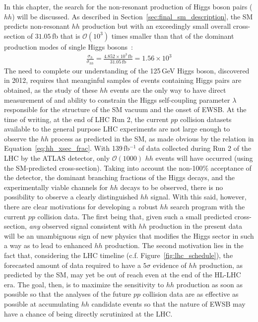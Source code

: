 In this chapter, the search for the non-resonant production of Higgs boson pairs ($hh$) will be discussed.
As described in Section~\ref{sec:final_sm_description}, the SM predicts non-resonant $hh$ production but with
an exceedingly small overall cross-section of $31.05$\,fb that is $\mathcal{O}(10^3)$ times smaller
than that of the dominant production modes of single Higgs bosons~\cite{deFlorian:2016spz,Dawson:1998py,Borowka:2016ehy,Baglio:2018lrj,deFlorian:2013jea,Shao:2013bz,deFlorian:2015moa,Grazzini:2018bsd}:
\begin{align}
    \frac{\sigma_h}{\sigma_{hh}} = \frac{ 4.852 \times 10^3\,\mathrm{fb}}{31.05\,\mathrm{fb}} = 1.56 \times 10^3
    \label{eq:hh_xsec_frac}
\end{align}
The need to complete our understanding of the 125\,GeV Higgs boson, discovered in 2012, requires
that meanginful samples of events containing Higgs pairs are obtained, as the study of these $hh$
events are the only way to have direct measurement of and ability to constrain the Higgs self-coupling parameter $\lambda$
responsible for the structure of the SM vacuum and the onset of EWSB.
At the time of writing, at the end of LHC Run 2, the current $pp$ collision datasets available to the
general purpose LHC experiments are not large enough to observe the $hh$ process as predicted in the SM,
as made obvious by the relation in  Equation~\ref{eq:hh_xsec_frac}.
With 139\,fb$^{-1}$ of data collected during Run 2 of the LHC by the ATLAS detector,
only $\mathcal{O}(1000)$ $hh$ events will have occurred (using the SM-predicted cross-section).
Taking into account the non-100\% acceptance of the detector, the dominant branching fractions
of the Higgs decays, and the experimentally viable channels for $hh$ decays to be observed,
there is no possibility to observe a clearly distinguished $hh$ signal.
With this said, however, there are clear motivations for developing a robust $hh$ search program with the
current $pp$ collision data.
The first being that, given such a small predicted cross-section, \textit{any} observed signal consistent
with $hh$ production in the present data will be an unambiguous sign of new physics
that modifies the Higgs sector in such a way as to lead to enhanced $hh$ production.
The second motivation lies in the fact that, considering the LHC timeline (c.f. Figure~\ref{fig:lhc_schedule}), the
forecasted amount of data required to have a $5\sigma$ evidence of $hh$ production, as predicted by the SM,
may yet be out of reach even at the end of the HL-LHC era.
The goal, then, is to maximize the sensitivity to $hh$ production as soon as possible so that
the analyses of the future $pp$ collision data are as effective as possible at accumulating $hh$
candidate events so that the nature of EWSB may have a chance of being directly scrutinized at the LHC.

